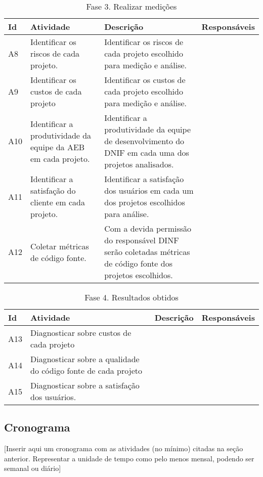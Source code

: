 \begin{table}[H]
\centering
\begin{tabular}{|p{1cm}|p{2cm}|p{5cm}|p{3cm}|}
\hline
	\textbf{Id} &
	\textbf{Atividade} &
	\textbf{Descrição} &
  \textbf{Responsáveis}
	\\ \hline
	A8 &
	Identificar os riscos de cada projeto. &
	Identificar os riscos de cada projeto escolhido para medição e análise. &

	\\ \hline
	A9 &
	Identificar os custos de cada projeto &
	Identificar os custos de cada projeto escolhido para medição e análise. &

	\\ \hline
	A10 &
	Identificar a produtividade da equipe da AEB em cada projeto. &
	Identificar a produtividade da equipe de desenvolvimento do DNIF em cada uma dos projetos analisados. &

	\\ \hline
	A11 &
	Identificar a satisfação do cliente em cada projeto. &
	Identificar a satisfação dos usuários em cada um dos projetos escolhidos para análise. &

	\\ \hline
	A12 &
	Coletar métricas de código fonte. &
	Com a devida permissão do responsável DINF serão coletadas métricas de código fonte dos projetos escolhidos. &

	\\ \hline
\end{tabular}
\caption{Fase 3. Realizar medições}
\label{tab:atividades_fase_3}
\end{table}

\begin{table}[H]
\centering
\begin{tabular}{|p{1cm}|p{2cm}|p{5cm}|p{3cm}|}
\hline
	\textbf{Id} &
	\textbf{Atividade} &
	\textbf{Descrição} &
  \textbf{Responsáveis}
	\\ \hline
	A13 &
	Diagnosticar sobre custos de cada projeto &
	 &

	\\ \hline
	A14 &
	Diagnosticar sobre  a qualidade do código fonte de cada projeto &
   &

	\\ \hline
	A15 &
	Diagnosticar sobre a satisfação dos usuários. &
	 &

	\\ \hline
\end{tabular}
\caption{Fase 4. Resultados obtidos}
\label{tab:atividades_fase_4}
\end{table}

\subsection{Cronograma}
  [Inserir aqui um cronograma com as atividades (no mínimo) citadas na seção anterior. Representar a unidade de tempo como pelo menos mensal, podendo ser semanal ou diário]
